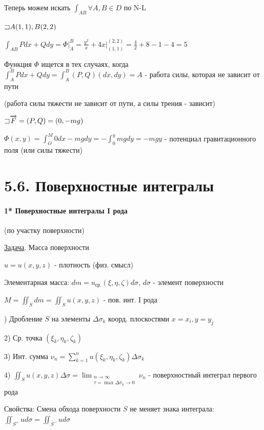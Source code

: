 \documentclass[12pt]{article}
\begin{document}
    Теперь можем искать $\int_{AB} \forall A, B \in D$ по N-L

    $\mathord{\sqsupset} A(1, 1), B(2, 2)$

    $\int_{AB} Pdx + Qdy = \Phi \Big|_A^B = \frac{y^2}{x} + 4x \Big|_{(1,1)}^{(2,2)} = \frac{4}{2} + 8 - 1 - 4 = 5$

    \Nota Функция $\Phi$ ищется в тех случаях, когда $\int_A^B Pdx + Qdy = \int^B_A (P, Q) (dx, dy) = A$ - работа силы, которая не зависит от пути

    (\Exs работа силы тяжести не зависит от пути, а силы трения - зависит)

    \Ex $\mathord{\sqsupset} \overrightarrow{F} = (P, Q) = (0, -mg)$

    $\Phi(x, y) = \int_O^M 0dx - mgdy = -\int_0^y mgdy = -mgy$ - потенциал гравитационного поля (или силы тяжести)



    \section{5.6. Поверхностные интегралы}

    \paragraph{1* Поверхностные интегралы I рода} (по участку поверхности)

    \underline{Задача}. Масса поверхности

    $u = u(x, y, z)$ - плотность (физ. смысл)

    Элементарная масса: $dm = u_{\text{ср.}}(\xi, \eta, \zeta) d\sigma$, $d\sigma$ - элемент поверхности

    $M = \iint_S dm = \iint_S u(x, y, z)$ - пов. инт. I рода

    ) Дробление $S$ на элементы $\Delta \sigma_k$ коорд. плоскостями $x = x_i, y = y_j$

    2) Ср. точка $(\xi_k, \eta_k, \zeta_k)$

    3) Инт. сумма $\nu_n = \sum_{k = 1}^{n} u(\xi_k, \eta_k, \zeta_k) \Delta \sigma_k$

    4) $\iint_S u(x, y, z) \Delta \sigma = \lim_{\substack{n \to \infty \\ \tau = \max \Delta \sigma_k \to 0}} \nu_n$ - поверхностный интеграл первого рода

    Свойства: Смена обхода поверхности $S$ не меняет знака интеграла: $\iint_{S^+} u d\sigma = \iint_{S^-} u d\sigma$
\end{document}
